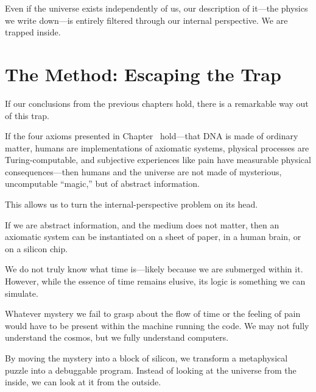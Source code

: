 Even if the universe exists independently of us, our description of it---the physics we write down---is entirely filtered through our internal perspective.
We are trapped inside.


\section{The Method: Escaping the Trap}

If our conclusions from the previous chapters hold, there is a remarkable way out of this trap.

If the four axioms presented in Chapter~ hold---that DNA is made of ordinary matter, humans are implementations of axiomatic systems, physical processes are Turing-computable, and subjective experiences like pain have measurable physical consequences---then humans and the universe are not made of mysterious, uncomputable ``magic,'' but of abstract information.

This allows us to turn the internal-perspective problem on its head.

If we are abstract information, and the medium does not matter, then an axiomatic system can be instantiated on a sheet of paper, in a human brain, or on a silicon chip.

We do not truly know what time is---likely because we are submerged within it.
However, while the essence of time remains elusive, its logic is something we can simulate.

Whatever mystery we fail to grasp about the flow of time or the feeling of pain would have to be present within the machine running the code.
We may not fully understand the cosmos, but we fully understand computers.

By moving the mystery into a block of silicon, we transform a metaphysical puzzle into a debuggable program.
Instead of looking at the universe from the inside, we can look at it from the outside.

